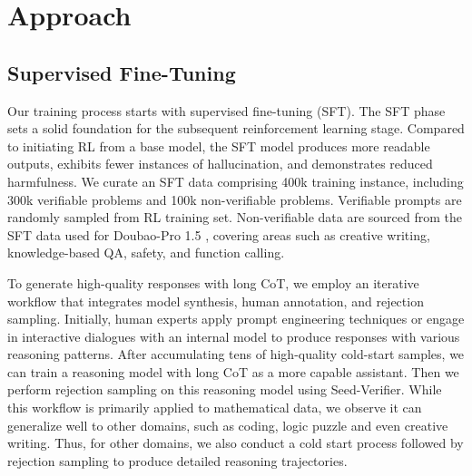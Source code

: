 \section{Approach}

\subsection{Supervised Fine-Tuning}

Our training process starts with supervised fine-tuning (SFT). The SFT phase sets a solid foundation for the subsequent reinforcement learning stage. Compared to initiating RL from a base model, the SFT model produces more readable outputs, exhibits fewer instances of hallucination, and demonstrates reduced harmfulness. We curate an SFT data comprising 400k training instance, including 300k verifiable problems and 100k non-verifiable problems. Verifiable prompts are randomly sampled from RL training set. Non-verifiable data are sourced from the SFT data used for Doubao-Pro 1.5 \cite{doubao1.5pro}, covering areas such as creative writing, knowledge-based QA, safety, and function calling.

To generate high-quality responses with long CoT, we employ an iterative workflow that integrates model synthesis, human annotation, and rejection sampling. Initially, human experts apply prompt engineering techniques or engage in interactive dialogues with an internal model to produce responses with various reasoning patterns. After accumulating tens of high-quality cold-start samples, we can train a reasoning model with long CoT as a more capable assistant. Then we perform rejection sampling on this reasoning model using Seed-Verifier. While this workflow is primarily applied to mathematical data, we observe it can generalize well to other domains, such as coding, logic puzzle and even creative writing. Thus, for other domains, we also conduct a cold start process followed by rejection sampling to produce detailed reasoning trajectories.


